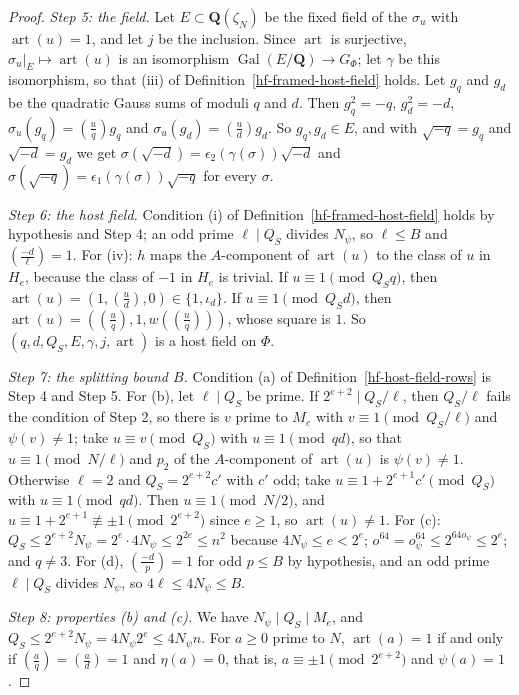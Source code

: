 \begin{proof}
\emph{Step 5: the field.} Let $E\subset\mathbf Q(\zeta_N)$ be the fixed field of the $\sigma_u$
with $\operatorname{art}(u)=1$, and let $j$ be the inclusion. Since $\operatorname{art}$ is
surjective, $\sigma_u|_E\mapsto\operatorname{art}(u)$ is an isomorphism
$\operatorname{Gal}(E/\mathbf Q)\to G_\Phi$; let $\gamma$ be this isomorphism, so that (iii) of
Definition~\ref{hf-framed-host-field} holds. Let $g_q$ and $g_d$ be the quadratic Gauss sums of
moduli $q$ and $d$. Then $g_q^2=-q$, $g_d^2=-d$, $\sigma_u(g_q)=\left(\frac uq\right)g_q$ and
$\sigma_u(g_d)=\left(\frac ud\right)g_d$. So $g_q,g_d\in E$, and with $\sqrt{-q}=g_q$ and
$\sqrt{-d}=g_d$ we get $\sigma(\sqrt{-d})=\epsilon_2(\gamma(\sigma))\sqrt{-d}$ and
$\sigma(\sqrt{-q})=\epsilon_1(\gamma(\sigma))\sqrt{-q}$ for every $\sigma$.

\emph{Step 6: the host field.} Condition (i) of Definition~\ref{hf-framed-host-field} holds by
hypothesis and Step 4; an odd prime $\ell\mid Q_S$ divides $N_\psi$, so $\ell\leq B$ and
$\left(\frac{-d}{\ell}\right)=1$. For (iv): $h$ maps the $A$-component of $\operatorname{art}(u)$ to
the class of $u$ in $H_e$, because the class of $-1$ in $H_e$ is trivial. If $u\equiv1\pmod{Q_Sq}$,
then $\operatorname{art}(u)=(1,\left(\frac ud\right),0)\in\{1,\iota_d\}$. If
$u\equiv1\pmod{Q_Sd}$, then $\operatorname{art}(u)=(\left(\frac uq\right),1,w(\left(\frac uq\right)))$,
whose square is $1$. So $(q,d,Q_S,E,\gamma,j,\operatorname{art})$ is a host field on $\Phi$.

\emph{Step 7: the splitting bound $B$.} Condition (a) of Definition~\ref{hf-host-field-rows} is
Step 4 and Step 5. For (b), let $\ell\mid Q_S$ be prime. If $2^{e+2}\mid Q_S/\ell$, then $Q_S/\ell$
fails the condition of Step 2, so there is $v$ prime to $M_e$ with $v\equiv1\pmod{Q_S/\ell}$ and
$\psi(v)\neq1$; take $u\equiv v\pmod{Q_S}$ with $u\equiv1\pmod{qd}$, so that $u\equiv1\pmod{N/\ell}$
and $p_2$ of the $A$-component of $\operatorname{art}(u)$ is $\psi(v)\neq1$. Otherwise $\ell=2$ and
$Q_S=2^{e+2}c'$ with $c'$ odd; take $u\equiv1+2^{e+1}c'\pmod{Q_S}$ with $u\equiv1\pmod{qd}$. Then
$u\equiv1\pmod{N/2}$, and $u\equiv1+2^{e+1}\not\equiv\pm1\pmod{2^{e+2}}$ since $e\geq1$, so
$\operatorname{art}(u)\neq1$. For (c): $Q_S\leq2^{e+2}N_\psi=2^e\cdot4N_\psi\leq2^{2e}\leq n^2$
because $4N_\psi\leq e<2^e$; $o^{64}=o_\psi^{64}\leq2^{64o_\psi}\leq2^e$; and $q\neq3$. For (d),
$\left(\frac{-d}{p}\right)=1$ for odd $p\leq B$ by hypothesis, and an odd prime $\ell\mid Q_S$
divides $N_\psi$, so $4\ell\leq4N_\psi\leq B$.

\emph{Step 8: properties (b) and (c).} We have $N_\psi\mid Q_S\mid M_e$, and
$Q_S\leq2^{e+2}N_\psi=4N_\psi2^e\leq4N_\psi n$. For $a\geq0$ prime to $N$,
$\operatorname{art}(a)=1$ if and only if $\left(\frac aq\right)=\left(\frac ad\right)=1$ and
$\eta(a)=0$, that is, $a\equiv\pm1\pmod{2^{e+2}}$ and $\psi(a)=1$.


\end{proof}
